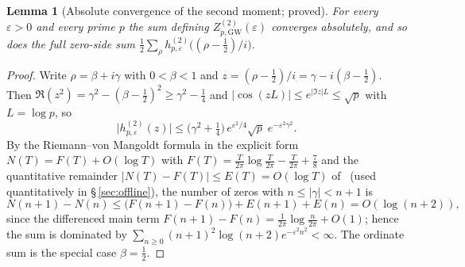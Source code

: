 \documentclass[11pt]{article}
\newtheorem{lemma}[theorem]{Lemma}
\newcommand{\ZtwoGW}{Z_{p,\mathrm{GW}}^{(2)}}   %
\begin{document}
\begin{lemma}[Absolute convergence of the second moment; proved]
\label{lem:conv}
For every $\varepsilon>0$ and every prime $p$ the sum defining
$\ZtwoGW(\varepsilon)$ converges absolutely, and so does the full zero-side
sum $\tfrac12\sum_\rho h^{(2)}_{p,\varepsilon}\bigl((\rho-\tfrac12)/i\bigr)$.
\end{lemma}

\begin{proof}
Write $\rho=\beta+i\gamma$ with $0<\beta<1$ and
$z=(\rho-\tfrac12)/i=\gamma-i(\beta-\tfrac12)$.
Then $\Re(z^2)=\gamma^2-(\beta-\tfrac12)^2\ge\gamma^2-\tfrac14$ and
$|\cos(zL)|\le e^{|\Im z|L}\le\sqrt p$ with $L=\log p$, so
\[
\bigl|h^{(2)}_{p,\varepsilon}(z)\bigr|
 \le \bigl(\gamma^2+\tfrac14\bigr)\,e^{\varepsilon^2/4}\sqrt p\;
   e^{-\varepsilon^2\gamma^2}.
\]
By the Riemann--von Mangoldt formula in the explicit form
$N(T)=F(T)+O(\log T)$ with $F(T)=\tfrac{T}{2\pi}\log\tfrac{T}{2\pi}
-\tfrac{T}{2\pi}+\tfrac78$ and the quantitative remainder
$|N(T)-F(T)|\le E(T)=O(\log T)$ of~\cite{HasanalizadeShenWong21} (used
quantitatively in \S\,\ref{sec:offline}), the number of zeros with
$n\le|\gamma|<n+1$ is
\[
N(n+1)-N(n)\le \bigl(F(n+1)-F(n)\bigr)+E(n+1)+E(n)=O(\log(n+2)),
\]
since the differenced main term $F(n+1)-F(n)=\tfrac1{2\pi}\log\tfrac{n}{2\pi}
+O(1)$; hence the sum is dominated by
$\sum_{n\ge 0}(n+1)^2\log(n+2)e^{-\varepsilon^2 n^2}<\infty$.
The ordinate sum is the special case $\beta=\tfrac12$.
\end{proof}
\end{document}
